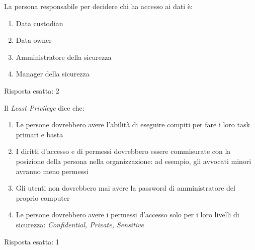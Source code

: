 \label{EsBCDR3}


\begin{Exercise} [
  title={Gestione dei dati},
  label={bcdr6}
 ]
 
 \Question La persona responsabile per decidere chi ha accesso ai dati è:
 \begin{enumerate}
   \item Data custodian
   \item Data owner
   \item Amministratore della sicurezza
   \item Manager della sicurezza
 \end{enumerate}
\end{Exercise}


\begin{Answer} [
  ref={bcdr6},
  number={6}
  ]
  
  \Question Risposta esatta: 2
  
\end{Answer}


\begin{Exercise} [
  title={Gestione dei dati},
  label={bcdr7}
  ]
  
  \Question Il \textit{Least Privilege} dice che:
  \begin{enumerate}
    \item Le persone dovrebbero avere l'abilità di eseguire compiti per fare i 
    loro task primari e basta
    \item I diritti d'accesso e di permessi dovrebbero essere commisurate con 
    la posizione della persona nella organizzazione: ad esempio, gli avvocati 
    minori avranno meno permessi
    \item Gli utenti non dovrebbero mai avere la password di amministratore del 
    proprio computer
    \item Le persone dovrebbero avere i permessi d'accesso solo per i loro 
    livelli di sicurezza: \textit{Confidential, Private, Sensitive}
  \end{enumerate}
\end{Exercise}


\begin{Answer} [
  ref={bcdr7},
  number={7}
  ]
  
  \Question Risposta esatta: 1
  
\end{Answer}

